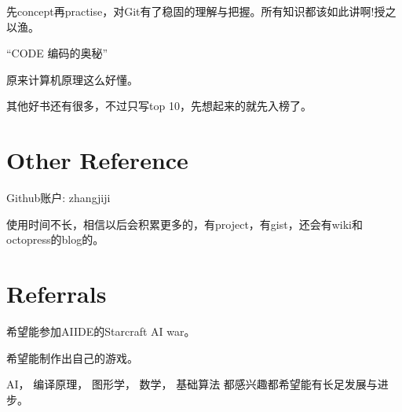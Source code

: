 \documentclass{article}
\begin{document}
\begin{CJK*}{UTF8}{gbsn}
先concept再practise，对Git有了稳固的理解与把握。所有知识都该如此讲啊!授之以渔。

``CODE 编码的奥秘''

原来计算机原理这么好懂。

其他好书还有很多，不过只写top 10，先想起来的就先入榜了。

\section*{Other Reference}

Github账户: zhangjiji

使用时间不长，相信以后会积累更多的，有project，有gist，还会有wiki和octopress的blog的。

\section*{Referrals}

希望能参加AIIDE的Starcraft AI war。

希望能制作出自己的游戏。

AI， 编译原理， 图形学， 数学， 基础算法 都感兴趣都希望能有长足发展与进步。

\end{CJK*}
\end{document}
